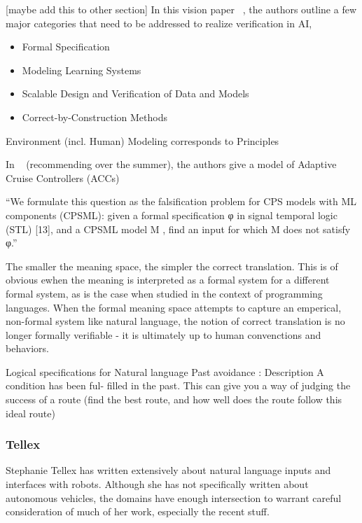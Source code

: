 \documentclass{article}
\begin{document}
[maybe add this to other section]
In this vision paper ~\cite{seshia2016towards}, the authors outline a few major
categories that need to be addressed to realize verification in AI,

\begin{itemize}
\item Formal Specification
\item Modeling Learning Systems
\item Scalable Design and Verification of Data and Models
\item Correct-by-Construction Methods
\end{itemize}

Environment (incl. Human) Modeling corresponds to Principles

In ~\cite{dreossiDS19} (recommending over the summer), the authors give a model of Adaptive Cruise Controllers (ACCs)

``We formulate this question as the falsification problem for CPS models with
ML components (CPSML): given a formal specification φ in signal temporal
logic (STL) [13], and a CPSML model M , find an input for which M does not
satisfy φ.''

The smaller the meaning space, the simpler the correct translation. This is of
obvious ewhen the meaning is interpreted as a formal system for a different
formal system, as is the case when studied in the context of programming
languages. When the formal meaning space attempts to capture an emperical,
non-formal system like natural language, the notion of correct translation is no
longer formally verifiable - it is ultimately up to human convenctions and
behaviors.

Logical specifications for Natural language
Past avoidance : Description
A condition has been ful-
filled in the past. This can give you a way of judging the success of a route (find the best route, and how well does the route follow this ideal route)





\subsubsection{Tellex}

Stephanie Tellex has written extensively about natural language inputs and
interfaces with robots. Although she has not specifically written about
autonomous vehicles, the domains have enough intersection to warrant careful
consideration of much of her work, especially the recent stuff.
\end{document}
